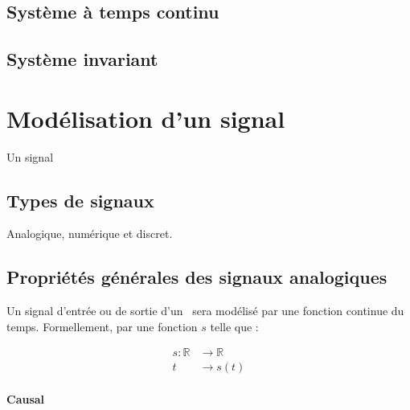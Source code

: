 \subsection{Système à temps continu}

\subsection{Système invariant}

\section{Modélisation d'un signal}
Un signal 


\subsection{Types de signaux}
\acpl
Analogique, numérique et discret.
\subsection{Propriétés générales des signaux analogiques}

Un signal d'entrée ou de sortie d'un \SLCI~sera modélisé par 
une fonction continue du temps. Formellement, par une fonction $s$ telle que :

\begin{align*}
	s : \mathbb{R}&\rightarrow\mathbb{R} \\
	t&\rightarrow s(t) 
\end{align*}

\paragraph{Causal}

